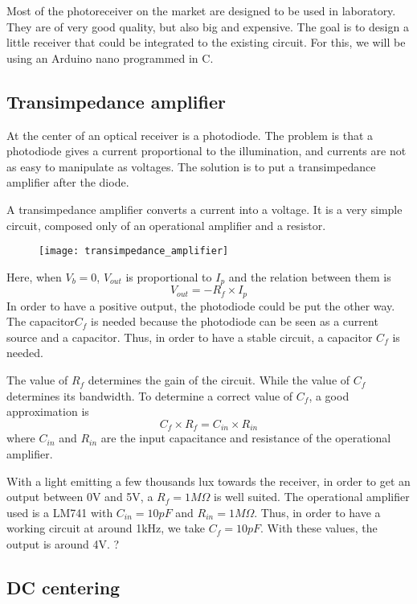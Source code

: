 \documentclass[12pt]{report}
\begin{document}
Most of the photoreceiver on the market are designed to be used in laboratory. They are of very good quality, but also big and expensive. The goal is to design a little receiver that could be integrated to the existing circuit.
For this, we will be using an Arduino nano programmed in C.



\subsection{Transimpedance amplifier}

At the center of an optical receiver is a photodiode. The problem is that a photodiode gives a current proportional to the illumination, and currents are not as easy to manipulate as voltages. The solution is to put a transimpedance amplifier after the diode.

A transimpedance amplifier converts a current into a voltage. It is a very simple circuit, composed only of an operational amplifier and a resistor.

\begin{figure}[h]
\centering
\texttt{[image: transimpedance\_amplifier]}
\end{figure}

Here, when $V_b = 0$, $V_{out}$ is proportional to $I_p$ and the relation between them is $$V_{out} = - R_f \times I_p$$
In order to have a positive output, the photodiode could be put the other way.
The capacitor$ C_f$ is needed because the photodiode can be seen as a current source and a capacitor. Thus, in order to have a stable circuit, a capacitor $C_f$ is needed.

The value of $R_f$ determines the gain of the circuit. While the value of $C_f$ determines its bandwidth. To determine a correct value of $C_f$, a good approximation is $$C_f \times R_f = C_{in} \times R_{in}$$ where $C_{in}$ and $R_{in}$ are the input capacitance and resistance of the operational amplifier.

With a light emitting a few thousands lux towards the receiver, in order to get an output between 0V and 5V, a $R_f = 1M\Omega$ is well suited.
 The operational amplifier used is a LM741 with $C_{in} = 10pF$ and $R_{in} = 1M\Omega$. Thus, in order to have a working circuit at around 1kHz, we take $C_f = 10pF$.
With these values, the output is around 4V. ?

\subsection{DC centering}
\end{document}
